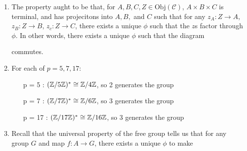 \documentclass[12pt, twosided]{article}
\begin{document}
\begin{enumerate}
\begin{proof}
    In order to see this, recall that there must exist identity morphisms on \(F\) and \(G\), so then the diagram

    \begin{center}
    \end{center}
    must commute with \(g \circ f = \mathrm{id}_F\) and \(f \circ g = \mathrm{id}_G\), so \(f\) and \(g\) are inverses, and so \(F\) and \(G\) are isomorphic.
  \end{proof}
\item The property aught to be that, for \(A, B, C, Z\in \mathrm{Obj}(\mathcal{C})\), \(A \times B \times C\) is terminal, and has projecitons into \(A, B,\) and \(C\) such that for any \(z_A: Z \to A\), \(z_B: Z \to B\), \(z_c: Z \to C\), there exists a unique \(\phi\) such that the \(z\)s factor through \(\phi\). In other words, there exists a unique \(\phi\) such that the diagram
  \begin{center}
  \end{center}
  commutes.
\item For each of \(p = 5, 7, 17\):
  \begin{itemize}
  \item [p = 5]: \((\mathbb{Z} / 5\mathbb{Z})^* \cong \mathbb{Z}/4\mathbb{Z}\), so 2 generates the group
  \item [p = 7]: \((\mathbb{Z} / 7\mathbb{Z})^* \cong \mathbb{Z}/6\mathbb{Z}\), so 3 generates the group
  \item [p = 17]: \((\mathbb{Z} / 17\mathbb{Z})^* \cong \mathbb{Z}/16\mathbb{Z}\), so 3 generates the group
  \end{itemize}
\item Recall that the universal property of the free group tells us that for any group \(G\) and map \(f: A \to G\), there exists a unique \(\phi\) to make


\end{enumerate}
\end{document}
